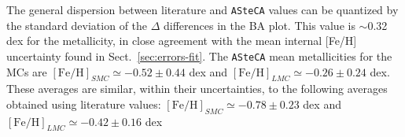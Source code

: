 \documentclass{aa}
\begin{document}
%
%

The general dispersion between literature and \texttt{ASteCA} values can be
quantized by the standard deviation of the $\Delta$ differences in the BA plot.
This value is $\sim$0.32 dex for the metallicity, in close agreement with the
mean internal [Fe/H] uncertainty found in Sect.~\ref{sec:errors-fit}.
The \texttt{ASteCA} mean metallicities for the MCs are
$\mathrm{[Fe/H]}_{SMC}{\simeq-}0.52{\pm}0.44$ dex and
$\mathrm{[Fe/H]}_{LMC}{\simeq-}0.26{\pm}0.24$ dex. These averages are similar,
within their uncertainties, to the following averages obtained using literature values:
$\mathrm{[Fe/H]}_{SMC}{\simeq-}0.78{\pm}0.23$ dex and
$\mathrm{[Fe/H]}_{LMC}{\simeq-}0.42{\pm}0.16$ dex\\
\end{document}
